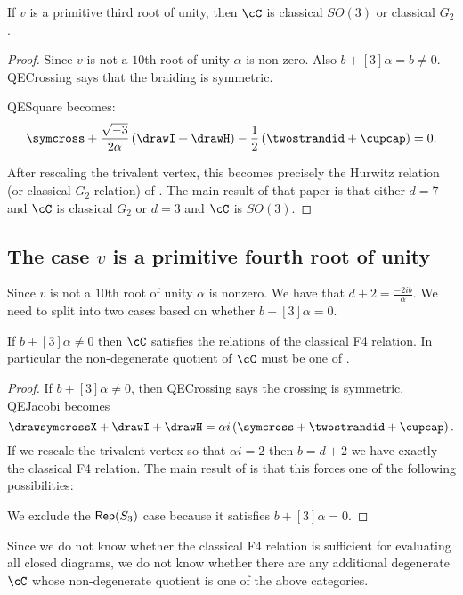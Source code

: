 \documentclass[12pt]{amsart}
\begin{document}
\begin{proposition}
If $v$ is a primitive third root of unity, then $\cC$ is classical $SO(3)$ or classical $G_2$.
\end{proposition}
\begin{proof}
Since $v$ is not a $10$th root of unity $\alpha$ is non-zero.  Also $b+[3]\alpha = b \neq 0$.  QECrossing says that the braiding is symmetric.  

QESquare becomes:
$$\symcross+\frac{\sqrt{-3}}{2\alpha} \left(\drawI + \drawH \right) -\frac{1}{2} \left(\twostrandid + \cupcap \right) = 0.$$

After rescaling the trivalent vertex, this becomes precisely the Hurwitz relation (or classical $G_2$ relation) of \cite{1011.6197}.  The main result of that paper is that either $d = 7$ and $\cC$ is classical $G_2$ or $d=3$ and $\cC$ is $SO(3)$.
\end{proof}

\subsection{The case \texorpdfstring{$v$}{v} is a primitive fourth root of unity}

Since $v$ is not a $10$th root of unity $\alpha$ is nonzero.  We have that $d+2 = \frac{-2ib}{\alpha}$.
We need to split into two cases based on whether $b+[3]\alpha = 0$.  

\begin{proposition}
If $b+[3]\alpha \neq 0$ then $\cC$ satisfies the relations of the classical F4 relation.  In particular the non-degenerate quotient of $\cC$ must be one of .
\end{proposition}
\begin{proof}
If $b+[3]\alpha \neq 0$, then QECrossing says the crossing is symmetric.   QEJacobi becomes
$$\drawsymcrossX + \drawI + \drawH = \alpha i \left(\symcross + \twostrandid + \cupcap \right).$$  If we rescale the trivalent vertex so that $\alpha i = 2$ then $b = d+2$ we have exactly the classical F4 relation.  The main result of \cite{F4E6} is that this forces one of the following possibilities:


We exclude the $\operatorname{\mathsf{Rep}}(S_3)$ case because it satisfies $b+[3]\alpha = 0$.
\end{proof}

Since we do not know whether the classical F4 relation is sufficient for evaluating all closed diagrams, we do not know whether there are any additional degenerate $\cC$ whose non-degenerate quotient is one of the above categories.
\end{document}

